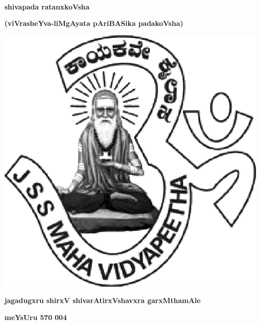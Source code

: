 ~\thispagestyle{empty}

\vfill

\begin{center}
{\fontsize{50}{50}\selectfont\bfseries shivapada ratanxkoVsha}\relax

\medskip

{\LARGE\bfseries (viVrasheYva-liMgAyata pAriBASika padakoVsha)}
\end{center}

\vfill



\vfill


\centerline{\includegraphics[scale=.3]{JSSlogo.eps}}

\medskip

\centerline{\large\bfseries jagadugxru shirxV shivarAtirxVshavxra  garxMthamAle}

\smallskip

\centerline{\large\bfseries meYsUru  570 004}
